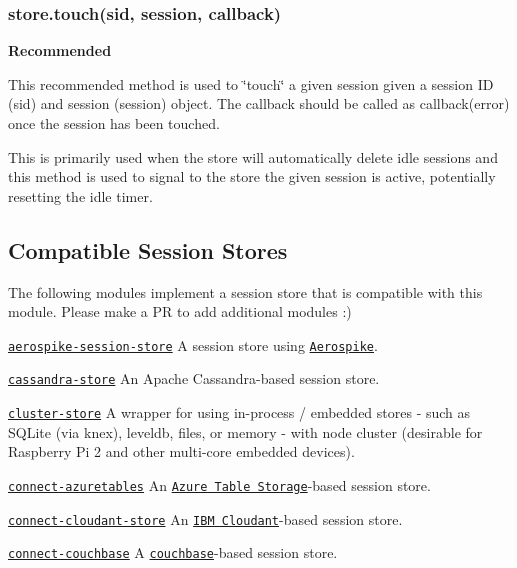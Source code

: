 \subsubsection*{store.\+touch(sid, session, callback)}

{\bfseries Recommended}

This recommended method is used to \char`\"{}touch\char`\"{} a given session given a session ID ({\ttfamily sid}) and session ({\ttfamily session}) object. The {\ttfamily callback} should be called as {\ttfamily callback(error)} once the session has been touched.

This is primarily used when the store will automatically delete idle sessions and this method is used to signal to the store the given session is active, potentially resetting the idle timer.

\subsection*{Compatible Session Stores}

The following modules implement a session store that is compatible with this module. Please make a PR to add additional modules \+:)

\href{https://www.npmjs.com/package/aerospike-session-store}{\tt aerospike-\/session-\/store} A session store using \href{http://www.aerospike.com/}{\tt Aerospike}.

\href{https://www.npmjs.com/package/cassandra-store}{\tt cassandra-\/store} An Apache Cassandra-\/based session store.

\href{https://www.npmjs.com/package/cluster-store}{\tt cluster-\/store} A wrapper for using in-\/process / embedded stores -\/ such as S\+Q\+Lite (via knex), leveldb, files, or memory -\/ with node cluster (desirable for Raspberry Pi 2 and other multi-\/core embedded devices).

\href{https://www.npmjs.com/package/connect-azuretables}{\tt connect-\/azuretables} An \href{https://azure.microsoft.com/en-gb/services/storage/tables/}{\tt Azure Table Storage}-\/based session store.

\href{https://www.npmjs.com/package/connect-cloudant-store}{\tt connect-\/cloudant-\/store} An \href{https://cloudant.com/}{\tt I\+BM Cloudant}-\/based session store.

\href{https://www.npmjs.com/package/connect-couchbase}{\tt connect-\/couchbase} A \href{http://www.couchbase.com/}{\tt couchbase}-\/based session store.


